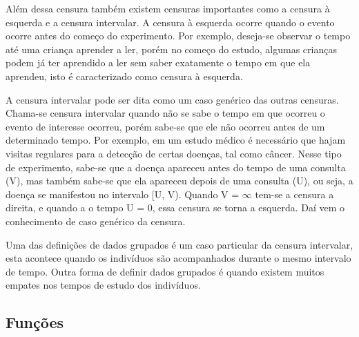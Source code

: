 \documentclass[a4paper,12pt]{article}
\begin{document}
Além dessa censura também existem censuras importantes como a censura à esquerda e a censura intervalar. A censura à esquerda ocorre quando o evento ocorre antes do começo do experimento. Por exemplo, deseja-se observar o tempo até uma criança aprender a ler, porém no começo do estudo, algumas crianças podem já ter aprendido a ler sem saber exatamente o tempo em que ela aprendeu, isto é caracterizado como censura à esquerda. %

A censura intervalar pode ser dita como um caso genérico das outras censuras. Chama-se censura intervalar quando não se sabe o tempo em que ocorreu o evento de interesse
ocorreu, porém sabe-se que ele não ocorreu antes de um determinado tempo. Por exemplo, em um estudo médico é necessário que hajam visitas regulares para a detecção de certas doenças, tal como câncer. Nesse tipo de experimento, sabe-se que a doença apareceu antes do tempo de uma consulta (V), mas também sabe-se que ela apareceu depois de uma consulta (U), ou seja, a doença se manifestou no intervalo [U, V). Quando V = $\infty$
tem-se a censura a direita, e quando a o tempo U = 0, essa censura se torna a esquerda. Daí vem o conhecimento de caso genérico da censura.

Uma das definições de dados grupados é um caso particular da censura intervalar, esta acontece quando os indivíduos são acompanhados durante o mesmo intervalo de tempo. Outra forma de definir dados grupados é quando existem muitos empates nos tempos de estudo dos indivíduos.

% 
% 

\subsection{Funções}
\end{document}
